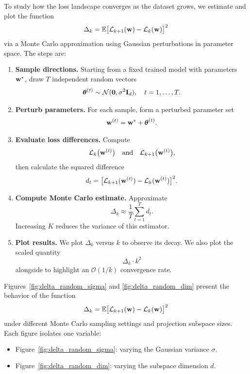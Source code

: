 \documentclass{article}
\begin{document}
To study how the loss landscape converges as the dataset grows, we estimate and plot the function
$$
  \Delta_k =
  \mathbb{E} \bigl[ \mathcal{L}_{k+1}(\mathbf{w}) - \mathcal{L}_k(\mathbf{w}) \bigr]^2
$$
via a Monte Carlo approximation using Gaussian perturbations in parameter space. The steps are:

\begin{enumerate}
  \item \textbf{Sample directions.}
        Starting from a fixed trained model with parameters $\mathbf{w}^*$, draw $T$ independent random vectors
        $$
          \boldsymbol{\theta}^{(t)} \sim \mathcal{N} (\mathbf 0, \sigma^2 \mathbf I_d), \quad
          t = 1, \dots, T.
        $$

  \item \textbf{Perturb parameters.}
        For each sample, form a perturbed parameter set
        $$
          \mathbf{w}^{(t)} =
          \mathbf{w}^* + \boldsymbol{\theta}^{(t)}.
        $$

  \item \textbf{Evaluate loss differences.}
        Compute
        $$
          \mathcal{L}_k \bigl( \mathbf{w}^{(t)} \bigr) \quad
          \text{and} \quad
          \mathcal{L}_{k+1} \bigl( \mathbf{w}^{(t)} \bigr),
        $$
        then calculate the squared difference
        $$
          d_t =
          \bigl[ \mathcal{L}_{k+1} (\mathbf{w}^{(t)}) - \mathcal{L}_k (\mathbf{w}^{(t)}) \bigr]^2.
        $$

  \item \textbf{Compute Monte Carlo estimate.}
        Approximate
        $$
          \Delta_k \approx
          \frac{1}{T} \sum_{t=1}^T d_t.
        $$
        Increasing $K$ reduces the variance of this estimator.

  \item \textbf{Plot results.}
        We plot $\Delta_k$ versus $k$ to observe its decay. We also plot the scaled quantity
        $$
          \Delta_k \cdot k^2
        $$
        alongside to highlight an $\mathcal O(1 / k)$ convergence rate.
\end{enumerate}

Figures~\ref{fig:delta_random_sigma} and \ref{fig:delta_random_dim} present the behavior of the function
$$
  \Delta_k =
  \mathbb{E} \bigl[ \mathcal{L}_{k+1}(\mathbf{w}) - \mathcal{L}_k(\mathbf{w}) \bigr]^2
$$
under different Monte Carlo sampling settings and projection subspace sizes. Each figure isolates one variable:

\begin{itemize}
  \item Figure~\ref{fig:delta_random_sigma}: varying the Gaussian variance $\sigma$.
  \item Figure~\ref{fig:delta_random_dim}: varying the subspace dimension $d$.
\end{itemize}
\end{document}
